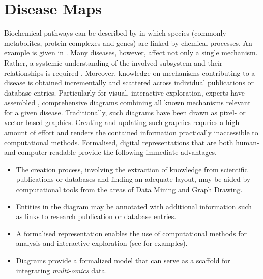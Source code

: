\documentclass[
	fontsize=10pt, %
	twoside=false, %
	secnumdepth=1, %
]{kaobook}
\begin{document}
\section{Disease Maps}

Biochemical pathways can be described by  in
which species (commonly metabolites, protein complexes and genes) are linked by
chemical processes. An example is given in .
%
Many diseases, however, affect not only a single mechanism. Rather, a systemic
understanding of the involved subsystem and their relationships is required
\cite{ostaszewski_CommunitydrivenRoadmapIntegrated_2019}\cite{mazein_SystemsMedicineDisease_2018}.
%
%
Moreover, knowledge on mechanisms contributing to a disease is obtained
incrementally and scattered across individual publications or database entries.
%
Particularly for visual, interactive exploration, experts have assembled
, comprehensive diagrams combining all known mechanisms
relevant for a given disease.
%
Traditionally, such diagrams have been drawn as pixel- or vector-based graphics.
Creating and updating such graphics requries a high amount of effort and renders
the contained information practically inaccessible to computational methods.
%
Formalised, digital representations that are both human- and computer-readable
provide the following immediate advantages. 
\begin{itemize}
\item The creation process, involving the extraction of knowledge from
  scientific publications or databases and finding an adequate layout, may be
  aided by computational tools from the areas of Data Mining and Graph Drawing.
  \item Entities in the diagram may be annotated with additional information
    such as links to research publication or database entries.
\item A formalised representation enables the use of computational methods for
  analysis and interactive exploration (see  for examples).
\item Diagrams provide a formalized model that can serve as a scaffold for
  integrating \textit{multi-omics} data. %
\end{itemize}
\end{document}
